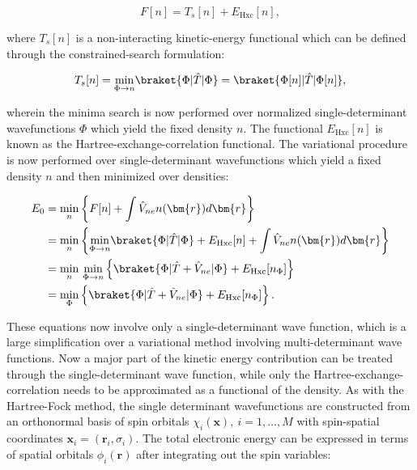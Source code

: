 \begin{equation}
 F[n] = T_s[n] + E_{\text{Hxc}}[n] ,
\end{equation}

where $T_s[n]$ is a non-interacting kinetic-energy functional
which can be defined through the constrained-search formulation:

\begin{equation}
 T_s[n] = \underset{\Phi \rightarrow n}{\min}
    \braket{\Phi | \hat{T} | \Phi}
    = \braket{\Phi[n] | \hat{T} | \Phi[n]} ,
\end{equation}

wherein the minima search is now performed over normalized
single-determinant wavefunctions $\Phi$ which yield
the fixed density $n$. The functional
$E_{\text{Hxc}}[n]$ is known as the Hartree-exchange-correlation
functional. The variational procedure is now
performed over single-determinant wavefunctions
which yield a fixed density $n$ and then
minimized over densities:

\begin{equation}
    \begin{split}
        E_0
        &= \underset{n}{\min} \left\{
            F[n] + \int \hat{V}_{ne} n(\bm{r}) d\bm{r} \right\} \\
        &= \underset{n}{\min} \left\{
            \underset{\Phi \rightarrow n}{\min}
            \braket{\Phi | \hat{T} | \Phi}
            + E_{\text{Hxc}}[n] + \int \hat{V}_{ne} n(\bm{r}) d\bm{r} \right\} \\
        &= \underset{n}{\min} \ \underset{\Phi \rightarrow n}{\min}
        \left\{ \braket{\Phi | \hat{T} + \hat{V}_{ne} | \Phi}
        + E_{\text{Hxc}}[n_{\Phi}]
        \right\} \\
        &=  \underset{\Phi}{\min}
            \left\{ \braket{\Phi|\hat{T} + \hat{V}_{ne}|\Phi}
            + E_{\text{Hxc}}[n_{\Phi}]\right\}.
    \end{split}
\end{equation}

These equations now involve only a single-determinant wave function,
which is a large simplification over a variational method involving
multi-determinant wave functions.
Now a major part of the kinetic energy contribution
can be treated through the single-determinant wave function,
while only the Hartree-exchange-correlation needs to be approximated
as a functional of the density.
As with the Hartree-Fock method, the single determinant
wavefunctions are constructed from an orthonormal basis of spin orbitals
$\chi_i (\bm{x}), \ i=1,\dots,M$ with spin-spatial
coordinates $\bm{x}_i = (\bm{r}_i, \sigma_i)$.
The total electronic energy can be expressed in terms of spatial
orbitals $\phi_i(\bm{r})$ after integrating out the spin variables:

